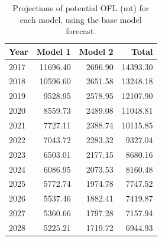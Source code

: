\documentclass[12pt,]{article}
\begin{document}
\begin{table}[ht]
\centering
\caption{Projections of potential OFL (mt) for each model, using the base model forecast.} 
\label{tab:OFL_projection}
\begin{tabular}{lrrr}
  \hline
Year & Model 1 & Model 2 & Total \\ 
  \hline
2017 & 11696.40 & 2696.90 & 14393.30 \\ 
  2018 & 10596.60 & 2651.58 & 13248.18 \\ 
  2019 & 9528.95 & 2578.95 & 12107.90 \\ 
  2020 & 8559.73 & 2489.08 & 11048.81 \\ 
  2021 & 7727.11 & 2388.74 & 10115.85 \\ 
  2022 & 7043.72 & 2283.32 & 9327.04 \\ 
  2023 & 6503.01 & 2177.15 & 8680.16 \\ 
  2024 & 6086.95 & 2073.53 & 8160.48 \\ 
  2025 & 5772.74 & 1974.78 & 7747.52 \\ 
  2026 & 5537.46 & 1882.41 & 7419.87 \\ 
  2027 & 5360.66 & 1797.28 & 7157.94 \\ 
  2028 & 5225.21 & 1719.72 & 6944.93 \\ 
   \hline
\end{tabular}
\end{table}\begin{table}[ht]
\centering
\caption{Summary of 10-year 
                                             projections beginning in 2018 
                                             for alternate states of nature based on 
                                             an axis of uncertainty for the Northern model.  Columns range over low, mid, and high
                                             states of nature, and rows range over different 
                                             assumptions of catch levels. An entry of "--" 
                                             indicates that the stock is driven to very low 
                                             abundance under the particular scenario.} 
\label{tab:Decision_table_mod1}
\end{table}
\end{document}

